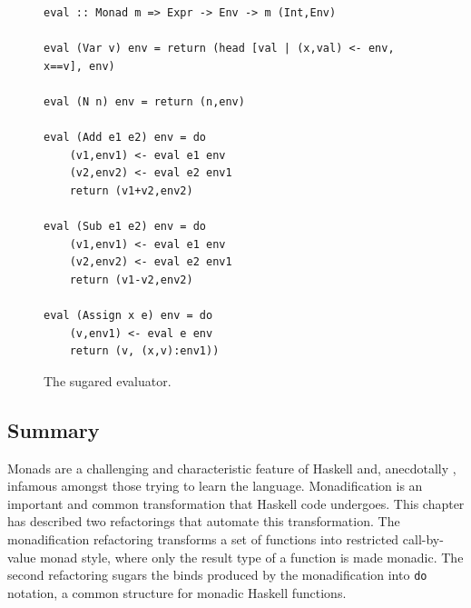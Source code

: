 \begin{figure}[t]
\begin{lstlisting}
eval :: Monad m => Expr -> Env -> m (Int,Env)

eval (Var v) env = return (head [val | (x,val) <- env, x==v], env)

eval (N n) env = return (n,env)

eval (Add e1 e2) env = do
	(v1,env1) <- eval e1 env
	(v2,env2) <- eval e2 env1
	return (v1+v2,env2)

eval (Sub e1 e2) env = do
	(v1,env1) <- eval e1 env 
	(v2,env2) <- eval e2 env1
	return (v1-v2,env2)

eval (Assign x e) env = do
	(v,env1) <- eval e env
	return (v, (x,v):env1))
\end{lstlisting}
\caption{The sugared evaluator.}
\label{finEval}
\end{figure}

\DIFaddbegin {}

\section{Summary}

\DIFaddend Monads are a challenging and characteristic feature of Haskell and, anecdotally \DIFaddbegin {}\DIFaddend , infamous amongst those trying to learn the language. Monadification is an important and common transformation that Haskell code undergoes. This chapter has described two refactorings that automate this transformation. The monadification refactoring transforms a set of functions into restricted call-by-value monad style, where only the result type of a function is made monadic. The second refactoring sugars the binds produced by the monadification into \texttt{do} notation, a common structure for monadic Haskell functions.

\DIFdelbegin \chapter{}
\addtocounter{chapter}{-1}%

